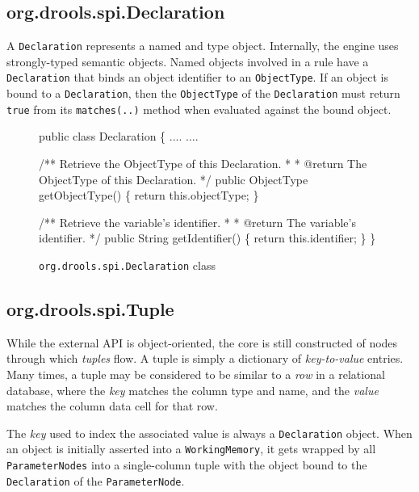 \subsection{org.drools.spi.Declaration}

A \verb|Declaration| represents a named and type object.  Internally,
the \drools{} engine uses strongly-typed semantic objects.  Named objects
involved in a rule have a \verb|Declaration| that binds an object
identifier to an \verb|ObjectType|.  If an object is bound to a
\verb|Declaration|, then the \verb|ObjectType| of the \verb|Declaration|
must return \verb|true| from its \verb|matches(..)| method when
evaluated against the bound object.

\begin{figure}
\begin{codelisting}
public class Declaration
\{
    ....
    ....

    /** Retrieve the ObjectType of this Declaration.
     *
     *  @return The ObjectType of this Declaration.
     */
    public ObjectType getObjectType()
    \{
        return this.objectType;
    \}

    /** Retrieve the variable's identifier.
     *
     *  @return The variable's identifier.
     */
    public String getIdentifier()
    \{
        return this.identifier;
    \}
\}
\end{codelisting}
\label{code.Declaration}
\caption{\texttt{org.drools.spi.Declaration} class}
\end{figure}

\subsection{org.drools.spi.Tuple}

While the external \drools{} API is object-oriented, the core is still
constructed of nodes through which \emph{tuples} flow.  A tuple is
simply a dictionary of \emph{key-to-value} entries.  Many times, a
tuple may be considered to be similar to a \emph{row} in a relational
database, where the \emph{key} matches the column type and name, and
the \emph{value} matches the column data cell for that row.  

The \emph{key} used to index the associated value is always a
\verb|Declaration| object. When an object is initially asserted into a
\verb|WorkingMemory|, it gets wrapped by all \verb|ParameterNodes|
into a single-column tuple with the object bound to the
\verb|Declaration| of the \verb|ParameterNode|.

